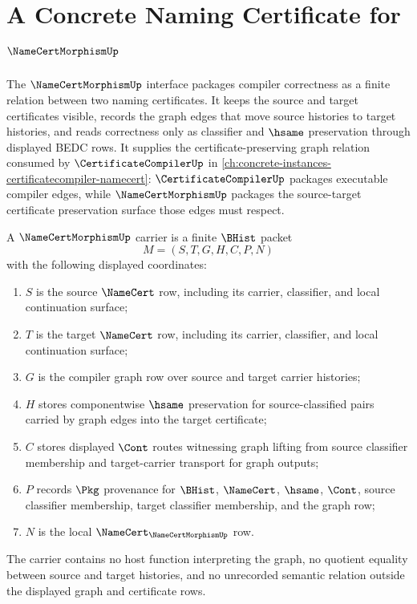 \chapter{A Concrete Naming Certificate for $\NameCertMorphismUp$}
\label{ch:concrete-instances-namecertmorphism-namecert}

The $\NameCertMorphismUp$ interface packages compiler correctness as a finite relation between two naming certificates. It keeps the source and target certificates visible, records the graph edges that move source histories to target histories, and reads correctness only as classifier and $\hsame$ preservation through displayed BEDC rows. It supplies the certificate-preserving graph relation consumed by $\CertificateCompilerUp$ in \autoref{ch:concrete-instances-certificatecompiler-namecert}: $\CertificateCompilerUp$ packages executable compiler edges, while $\NameCertMorphismUp$ packages the source-target certificate preservation surface those edges must respect.

\begin{definition}
\label{def:namecert-morphism-carrier}
A $\NameCertMorphismUp$ carrier is a finite $\BHist$ packet
$$
M=(S,T,G,H,C,P,N)
$$
with the following displayed coordinates:
\begin{enumerate}
\item $S$ is the source $\NameCert$ row, including its carrier, classifier, and local continuation surface;
\item $T$ is the target $\NameCert$ row, including its carrier, classifier, and local continuation surface;
\item $G$ is the compiler graph row over source and target carrier histories;
\item $H$ stores componentwise $\hsame$ preservation for source-classified pairs carried by graph edges into the target certificate;
\item $C$ stores displayed $\Cont$ routes witnessing graph lifting from source classifier membership and target-carrier transport for graph outputs;
\item $P$ records $\Pkg$ provenance for $\BHist$, $\NameCert$, $\hsame$, $\Cont$, source classifier membership, target classifier membership, and the graph row;
\item $N$ is the local $\NameCert_{\NameCertMorphismUp}$ row.
\end{enumerate}
The carrier contains no host function interpreting the graph, no quotient equality between source and target histories, and no unrecorded semantic relation outside the displayed graph and certificate rows.
\end{definition}

